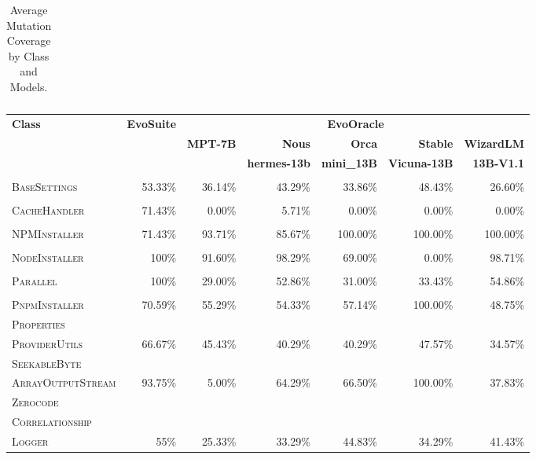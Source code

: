 \begin{table}[H]
\begin{tabular}{| l | r | r | r | r | r | r |}
\end{tabular}
\caption{Average Mutation Coverage by Class and Models.}
\label{tab:mutation_coverage}
\end{table}

\begin{table}[H]
\centering

\begin{tabular}{| l | r | r | r | r | r | r |}
\hline
\multirow{2}{*}{\textbf{Class}} & \multirow{2}{*}{\textbf{EvoSuite}} & \multicolumn{5}{c|}{\textbf{EvoOracle}} \\ %
\cline{3-7} %
 &  & \textbf{MPT-7B} & \textbf{Nous} & \textbf{Orca} & \textbf{Stable} & \textbf{WizardLM} \\
 &  &  & \textbf{hermes-13b} & \textbf{mini\_13B} & \textbf{Vicuna-13B} & \textbf{13B-V1.1} \\
\hline
\scriptsize\textsc{} &  &  &  &  &  &  \\
\scriptsize\textsc{BaseSettings} & 53.33\% & 36.14\% & 43.29\% & 33.86\% & 48.43\% & 26.60\% \\
\hline
\scriptsize\textsc{} &  &  &  &  &  &  \\
\scriptsize\textsc{CacheHandler} & 71.43\% & 0.00\% & 5.71\% & 0.00\% & 0.00\% & 0.00\% \\
\hline
\scriptsize\textsc{} &  &  &  &  &  &  \\
\scriptsize\textsc{NPMInstaller} & 71.43\% & 93.71\% & 85.67\% & 100.00\% & 100.00\% & 100.00\% \\
\hline
\scriptsize\textsc{} &  &  &  &  &  &  \\
\scriptsize\textsc{NodeInstaller} & 100\% & 91.60\% & 98.29\% & 69.00\% & 0.00\% & 98.71\% \\
\hline
\scriptsize\textsc{} &  &  &  &  &  &  \\
\scriptsize\textsc{Parallel} & 100\% & 29.00\% & 52.86\% & 31.00\% & 33.43\% & 54.86\% \\
\hline
\scriptsize\textsc{} &  &  &  &  &  &  \\
\scriptsize\textsc{PnpmInstaller} & 70.59\% & 55.29\% & 54.33\% & 57.14\% & 100.00\% & 48.75\% \\
\hline
\scriptsize\textsc{Properties} &  &  &  &  &  &  \\
\scriptsize\textsc{ProviderUtils} & 66.67\% & 45.43\% & 40.29\% & 40.29\% & 47.57\% & 34.57\% \\
\hline
\scriptsize\textsc{SeekableByte} &  &  &  &  &  &  \\
\scriptsize\textsc{ArrayOutputStream} & 93.75\% & 5.00\% & 64.29\% & 66.50\% & 100.00\% & 37.83\% \\
\hline
\scriptsize\textsc{Zerocode} &  &  &  &  &  &  \\
\scriptsize\textsc{Correlationship} &  &  &  &  &  &  \\
\scriptsize\textsc{Logger} & 55\% & 25.33\% & 33.29\% & 44.83\% & 34.29\% & 41.43\% \\
\hline


\end{tabular}
\end{table}
